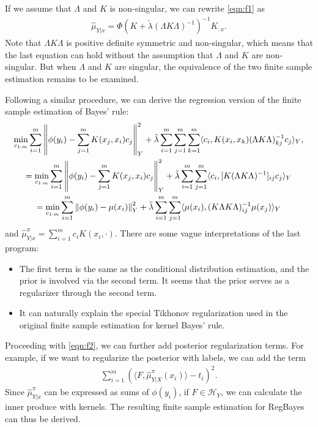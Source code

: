 \documentclass[a4paper]{article}
\renewcommand{\cal}{\mathcal}
\newcommand{\norm}[1]{\left\lVert#1\right\rVert}
\begin{document}
If we assume that $\Lambda$ and $K$ is non-singular, we can rewrite \eqref{eqn:f1} as
\begin{align}
\widehat{\mu}_{Y|x} = \Phi (K +　\tilde{\lambda} (\Lambda K\Lambda)^{-1})^{-1} K_{:x}.
\end{align}
Note that $\Lambda K\Lambda$ is positive definite symmetric and non-singular, which means that the last equation can hold without the assumption that $\Lambda$ and $K$ are non-singular. But when $\Lambda$ and $K$ are singular, the equivalence of the two finite sample estimation remains to be examined.

Following a similar procedure, we can derive the regression version of the finite sample estimation of Bayes' rule:
\begin{gather}
\min_{c_{1:m}} \sum_{i=1}^m \norm{\phi(y_i) - \sum_{j=1}^m K(x_j,x_i)c_j}_Y^2 + \tilde{\lambda} \sum_{i=1}^m \sum_{j=1}^m \sum_{k=1}^m \langle c_i, K(x_i,x_k)(\Lambda K\Lambda )^{-1}_{kj}  c_j\rangle_Y,\notag\\
=\min_{c_{1:m}} \sum_{i=1}^m \norm{\phi(y_i) - \sum_{j=1}^m K(x_j,x_i)c_j}_Y^2 + \tilde{\lambda} \sum_{i=1}^m \sum_{j=1}^m \langle c_i, [K(\Lambda K\Lambda )^{-1}]_{ij}  c_j\rangle_Y \label{eqn:f2}\\
=\min_{c_{1:m}} \sum_{i=1}^m \norm{\phi(y_i) - \mu(x_i)}_Y^2 + \tilde{\lambda} \sum_{i=1}^m \sum_{j=1}^m \langle \mu(x_i), (K\Lambda K\Lambda)^{-1}_{ij}\mu(x_j)\rangle_Y
\end{gather}
and $\widehat{\mu}_{Y|x}^\pi = \sum_{i=1}^m c_i K(x_i,\cdot)$. There are some vague interpretations of the last program:
\begin{itemize}
\item The first term is the same as the conditional distribution estimation, and the prior is involved via the second term. It seems that the prior serves as a regularizer through the second term.
\item It can naturally explain the special Tikhonov regularization used in the original finite sample estimation for kernel Bayes' rule.
\end{itemize}

Proceeding with \eqref{eqn:f2}, we can further add posterior regularization terms. For example, if we want to regularize the posterior with labels, we can add the term
\begin{align}
\sum_{i=1}^m \left( \langle F,\widehat{\mu}_{Y|X}^\pi(x_i)\rangle - t_i \right)^2.
\end{align}
Since $\widehat{\mu}_{Y|x}^\pi$ can be expressed as sums of $\phi(y_i)$, if $F\in\cal{H}_Y$, we can calculate the inner produce with kernels. The resulting finite sample estimation for RegBayes can thus be derived.
\end{document}
